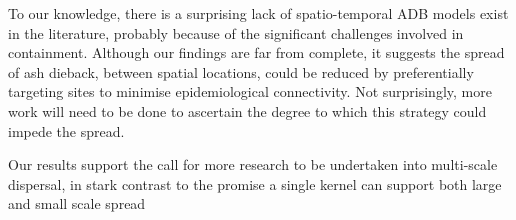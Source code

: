 


To our knowledge, there is a surprising lack of spatio-temporal ADB models exist in the literature, probably because of the significant challenges involved in containment. Although our findings are far from complete, it suggests the spread of ash dieback, between spatial locations, could be reduced by preferentially targeting sites to minimise epidemiological connectivity. Not surprisingly, more work will need to be done to ascertain the degree to which this strategy could impede the spread. 






Our results support the call for more research to be undertaken into multi-scale dispersal, in stark contrast to the promise a single kernel can support both large and small scale spread \cite{https://doi.org/10.1111/jbi.13642} %





